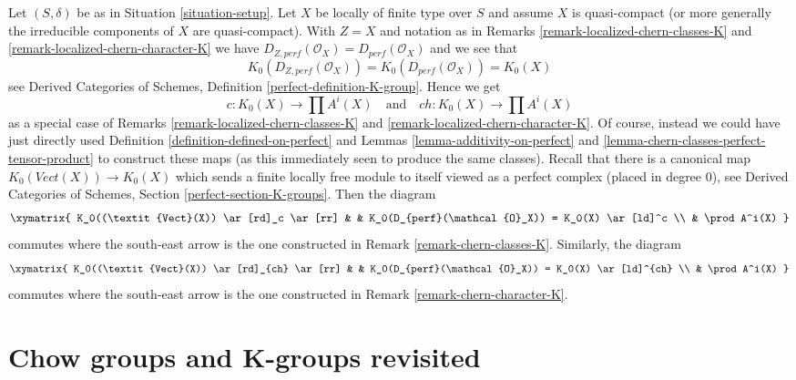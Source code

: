\begin{remark}
\label{remark-chern-classes-agree}
Let $(S, \delta)$ be as in Situation \ref{situation-setup}.
Let $X$ be locally of finite type over $S$ and assume $X$
is quasi-compact (or more generally the irreducible components
of $X$ are quasi-compact). With $Z = X$ and notation as in
Remarks \ref{remark-localized-chern-classes-K} and
\ref{remark-localized-chern-character-K}
we have $D_{Z, perf}(\mathcal{O}_X) = D_{perf}(\mathcal{O}_X)$
and we see that
$$
K_0(D_{Z, perf}(\mathcal{O}_X)) = K_0(D_{perf}(\mathcal{O}_X)) = K_0(X)
$$
see 
Derived Categories of Schemes, Definition \ref{perfect-definition-K-group}.
Hence we get
$$
c : K_0(X) \to \prod A^i(X)
\quad\text{and}\quad
ch : K_0(X) \to \prod A^i(X)
$$
as a special case of Remarks \ref{remark-localized-chern-classes-K} and
\ref{remark-localized-chern-character-K}. Of course, instead we could
have just directly used Definition \ref{definition-defined-on-perfect} and
Lemmas \ref{lemma-additivity-on-perfect} and
\ref{lemma-chern-classes-perfect-tensor-product} to construct these maps
(as this immediately seen to produce the same classes).
Recall that there is a canonical map $K_0(\textit{Vect}(X)) \to K_0(X)$
which sends a finite locally free module to itself viewed
as a perfect complex (placed in degree $0$), see
Derived Categories of Schemes, Section \ref{perfect-section-K-groups}.
Then the diagram
$$
\xymatrix{
K_0((\textit{Vect}(X)) \ar[rd]_c \ar[rr] & &
K_0(D_{perf}(\mathcal{O}_X)) = K_0(X) \ar[ld]^c \\
& \prod A^i(X)
}
$$
commutes where the south-east arrow is the one constructed in
Remark \ref{remark-chern-classes-K}. Similarly, the diagram
$$
\xymatrix{
K_0((\textit{Vect}(X)) \ar[rd]_{ch} \ar[rr] & &
K_0(D_{perf}(\mathcal{O}_X)) = K_0(X) \ar[ld]^{ch} \\
& \prod A^i(X)
}
$$
commutes where the south-east arrow is the one constructed in
Remark \ref{remark-chern-character-K}.
\end{remark}











\section{Chow groups and K-groups revisited}
\label{section-chow-and-K-II}


